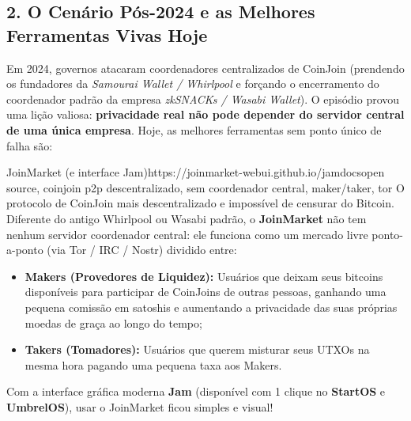 \documentclass{pousadaguide}
\begin{document}
\subsection{2. O Cenário Pós-2024 e as Melhores Ferramentas Vivas Hoje}

Em 2024, governos atacaram coordenadores centralizados de CoinJoin (prendendo os fundadores da \emph{Samourai Wallet / Whirlpool} e forçando o encerramento do coordenador padrão da empresa \emph{zkSNACKs / Wasabi Wallet}). O episódio provou uma lição valiosa: \textbf{privacidade real não pode depender do servidor central de uma única empresa}. Hoje, as melhores ferramentas sem ponto único de falha são:

\begin{ferramenta}[goat,logo=joinmarket]{JoinMarket (e interface Jam)}{https://joinmarket-webui.github.io/jamdocs}{open source, coinjoin p2p descentralizado, sem coordenador central, maker/taker, tor}
O protocolo de CoinJoin mais descentralizado e impossível de censurar do Bitcoin. Diferente do antigo Whirlpool ou Wasabi padrão, o \textbf{JoinMarket} não tem nenhum servidor coordenador central: ele funciona como um mercado livre ponto-a-ponto (via Tor / IRC / Nostr) dividido entre:
\begin{itemize}
  \item \textbf{Makers (Provedores de Liquidez):} Usuários que deixam seus bitcoins disponíveis para participar de CoinJoins de outras pessoas, ganhando uma pequena comissão em satoshis e aumentando a privacidade das suas próprias moedas de graça ao longo do tempo;
  \item \textbf{Takers (Tomadores):} Usuários que querem misturar seus UTXOs na mesma hora pagando uma pequena taxa aos Makers.
\end{itemize}
Com a interface gráfica moderna \textbf{Jam} (disponível com 1 clique no \textbf{StartOS} e \textbf{UmbrelOS}), usar o JoinMarket ficou simples e visual! 
\end{ferramenta}
\end{document}
